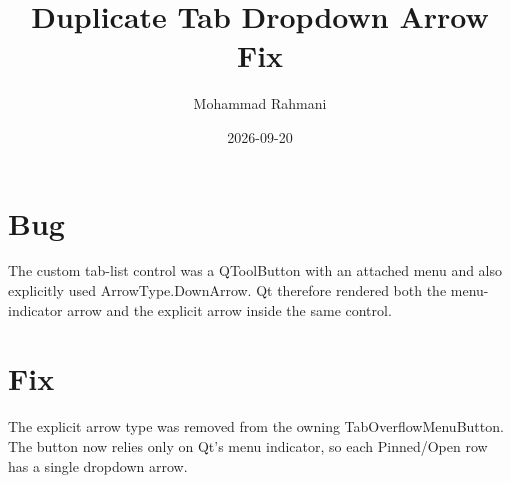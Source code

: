 \documentclass[a4paper]{article}
\title{Duplicate Tab Dropdown Arrow Fix}
\date{2026-09-20}
\author{Mohammad Rahmani}
\begin{document}
   \maketitle

   \begin{preview}
      \section{Bug}
      The custom tab-list control was a QToolButton with an attached menu and
      also explicitly used ArrowType.DownArrow. Qt therefore rendered both the
      menu-indicator arrow and the explicit arrow inside the same control.

      \section{Fix}
      The explicit arrow type was removed from the owning
      TabOverflowMenuButton. The button now relies only on Qt's menu indicator,
      so each Pinned/Open row has a single dropdown arrow.
   \end{preview}

   
   
\end{document}
